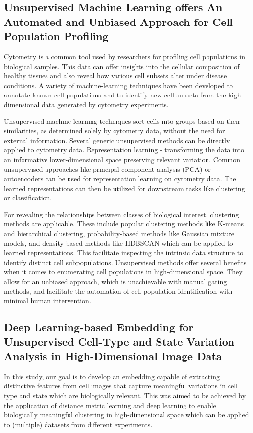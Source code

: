 \documentclass[12pt,a4paper]{article}
\begin{document}
\subsection{Unsupervised Machine Learning offers An Automated and Unbiased Approach for Cell Population Profiling}

Cytometry is a common tool used by researchers for profiling cell populations in biological samples. This data can offer insights into the cellular composition of healthy tissues and also reveal how various cell subsets alter under disease conditions. A variety of machine-learning techniques have been developed to annotate known cell populations and to identify new cell subsets from the high-dimensional data generated by cytometry experiments.

Unsupervised machine learning techniques sort cells into groups based on their similarities, as determined solely by cytometry data, without the need for external information. Several generic unsupervised methods can be directly applied to cytometry data. Representation learning - transforming the data into an informative lower-dimensional space preserving relevant variation. Common unsupervised approaches like principal component analysis (PCA) or autoencoders can be used for representation learning on cytometry data. The learned representations can then be utilized for downstream tasks like clustering or classification.

For revealing the relationships between classes of biological interest, clustering methods are applicable. These include popular clustering methods like K-means and hierarchical clustering, probability-based methods like Gaussian mixture models, and density-based methods like HDBSCAN which can be applied to learned representations. This facilitate inspecting the intrinsic data structure to identify distinct cell subpopulations. Unsupervised methods offer several benefits when it comes to enumerating cell populations in high-dimensional space. They allow for an unbiased approach, which is unachievable with manual gating methods, and facilitate the automation of cell population identification with minimal human intervention.


\subsection{Deep Learning-based Embedding for Unsupervised Cell-Type and State Variation Analysis in High-Dimensional Image Data}
In this study, our goal is to develop an embedding capable of extracting distinctive features from cell images that capture meaningful variations in cell type and state which are biologically relevant. This was aimed to be achieved by the application of distance metric learning and deep learning to enable biologically meaningful clustering in high-dimensional space which can be applied to (multiple) datasets from different experiments.
\end{document}
